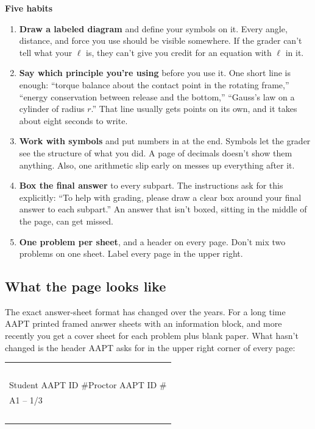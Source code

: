 \documentclass[11pt]{article}
\begin{document}
\begin{keybox}
\textbf{Five habits}
\begin{enumerate}\setlength{\itemsep}{3pt}
\item \textbf{Draw a labeled diagram} and define your symbols on it. Every angle, distance,
and force you use should be visible somewhere. If the grader can't tell what your $\ell$ is,
they can't give you credit for an equation with $\ell$ in it.
\item \textbf{Say which principle you're using} before you use it. One short line is
enough: ``torque balance about the contact point in the rotating frame,'' ``energy
conservation between release and the bottom,'' ``Gauss's law on a cylinder of radius $r$.''
That line usually gets points on its own, and it takes about eight seconds to write.
\item \textbf{Work with symbols} and put numbers in at the end. Symbols let the grader see
the structure of what you did. A page of decimals doesn't show them anything. Also, one
arithmetic slip early on messes up everything after it.
\item \textbf{Box the final answer} to every subpart. The instructions ask for this
explicitly: ``To help with grading, please draw a clear box around your final answer to each
subpart.'' An answer that isn't boxed, sitting in the middle of the page, can get missed.
\item \textbf{One problem per sheet}, and a header on every page. Don't mix two problems on
one sheet. Label every page in the upper right.
\end{enumerate}
\end{keybox}

\subsection*{What the page looks like}

The exact answer-sheet format has changed over the years. For a long time AAPT printed
framed answer sheets with an information block, and more recently you get a cover sheet for
each problem plus blank paper. What hasn't changed is the header AAPT asks for in the upper
right corner of every page:

\begin{center}
\begin{tabular}{|l|}
\hline
\ \\
\hspace{2mm}\textsf{Student AAPT ID \#\hspace{12mm}Proctor AAPT ID \#}\hspace{2mm} \\[4pt]
\hspace{2mm}\textsf{A1 -- 1/3}\hspace{2mm} \\
\ \\
\hline
\end{tabular}
\end{center}
\end{document}
